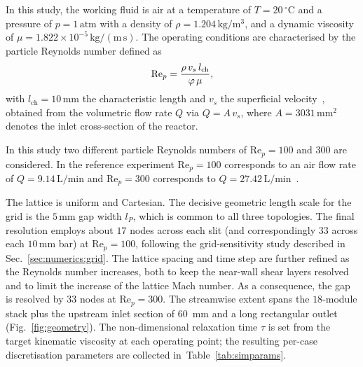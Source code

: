 In this study, the working fluid is air at a temperature of $T = 20\,^\circ\mathrm{C}$ and a pressure of $p = 1\,\mathrm{atm}$ with a density of $\rho = 1.204\,\mathrm{kg/m^3}$, and a dynamic viscosity of $\mu = 1.822\times10^{-5}\,\mathrm{kg/(m\,s)}$. The operating conditions are characterised by the particle Reynolds number defined as
\begin{equation}
    \hbox{Re}_p = \frac{\rho\,v_s\,l_\mathrm{ch}}{\varphi\,\mu},
    \label{eq:rep}
\end{equation}
with $l_\mathrm{ch}=10\,\mathrm{mm}$ the characteristic length and $v_s$ the superficial velocity~\cite{velten2026}, obtained from the volumetric flow rate $Q$ via $Q = A\,v_s$, where $A = 3031\,\mathrm{mm^2}$ denotes the inlet cross-section of the reactor.

In this study two different particle Reynolds numbers of Re$_p=100$ and $300$ are considered. In the reference experiment Re$_p = 100$ corresponds to an air flow rate of $Q = 9.14\,\mathrm{L/min}$ and Re$_p = 300$ corresponds to $Q = 27.42\,\mathrm{L/min}$~\cite{velten2026}.

The lattice is uniform and Cartesian. The decisive geometric length scale for the grid is the $5\,\mathrm{mm}$ gap width $l_P$, which is common to all three topologies. The final resolution employs about $17$ nodes across each slit (and correspondingly $33$ across each $10\,\mathrm{mm}$ bar) at Re$_p = 100$, following the grid-sensitivity study described in Sec.~\ref{sec:numerics:grid}. The lattice spacing and time step are further refined as the Reynolds number increases, both to keep the near-wall shear layers resolved and to limit the increase of the lattice Mach number. As a consequence, the gap is resolved by $33$ nodes at Re$_p = 300$. The streamwise extent spans the $18$-module stack plus the upstream inlet section of 60~mm and a long rectangular outlet (Fig.~\ref{fig:geometry}). The non-dimensional relaxation time $\tau$ is set from the target kinematic viscosity at each operating point; the resulting per-case discretisation parameters are collected in~Table~\ref{tab:simparams}.

